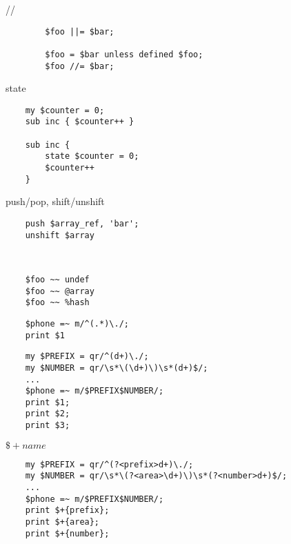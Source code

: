 \documentclass[14pt]{beamer}
\begin{document}
\begin{frame}[fragile]
    //
    \lstset{language=Perl}
    \begin{lstlisting}
        $foo ||= $bar;

        $foo = $bar unless defined $foo;
        $foo //= $bar;
    \end{lstlisting}
\end{frame}

\begin{frame}[fragile]
    state
    \lstset{language=Perl}
    \begin{lstlisting}
    my $counter = 0;
    sub inc { $counter++ }

    sub inc {
        state $counter = 0;
        $counter++
    }
    \end{lstlisting}
\end{frame}

\begin{frame}[fragile]
    push/pop, shift/unshift
    \lstset{language=Perl}
    \begin{lstlisting}
    push $array_ref, 'bar';
    unshift $array
    \end{lstlisting}
\end{frame}

\begin{frame}[fragile]
    ~~
    \lstset{language=Perl}
    \begin{lstlisting}
    $foo ~~ undef
    $foo ~~ @array
    $foo ~~ %hash
    \end{lstlisting}
\end{frame}

\begin{frame}[fragile]
    \lstset{language=Perl}
    \begin{lstlisting}
    $phone =~ m/^(.*)\./;
    print $1
    \end{lstlisting}
\end{frame}

\begin{frame}[fragile]
    \lstset{language=Perl}
    \begin{lstlisting}
    my $PREFIX = qr/^(d+)\./;
    my $NUMBER = qr/\s*\(\d+)\)\s*(d+)$/;
    ...
    $phone =~ m/$PREFIX$NUMBER/;
    print $1;
    print $2;
    print $3;
    \end{lstlisting}
\end{frame}

\begin{frame}[fragile]
    $\$+{name}$
    \lstset{language=Perl}
    \begin{lstlisting}
    my $PREFIX = qr/^(?<prefix>d+)\./;
    my $NUMBER = qr/\s*\(?<area>\d+)\)\s*(?<number>d+)$/;
    ...
    $phone =~ m/$PREFIX$NUMBER/;
    print $+{prefix};
    print $+{area};
    print $+{number};
    \end{lstlisting}
\end{frame}
\end{document}
